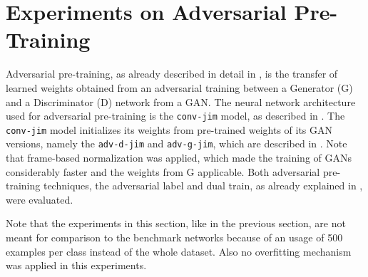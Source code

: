
\section{Experiments on Adversarial Pre-Training}\label{sec:exp_adv}
Adversarial pre-training, as already described in detail in , is the transfer of learned weights obtained from an adversarial training between a Generator (G) and a Discriminator (D) network from a GAN.
The neural network architecture used for adversarial pre-training is the \texttt{conv-jim} model, as described in .
The \texttt{conv-jim} model initializes its weights from pre-trained weights of its GAN versions, namely the \texttt{adv-d-jim} and \texttt{adv-g-jim}, which are described in .
Note that frame-based normalization was applied, which made the training of GANs considerably faster and the weights from G applicable.
Both adversarial pre-training techniques, the adversarial label and dual train, as already explained in , were evaluated.

Note that the experiments in this section, like in the previous section, are not meant for comparison to the benchmark networks because of an usage of 500 examples per class instead of the whole dataset.
Also no overfitting mechanism was applied in this experiments.



